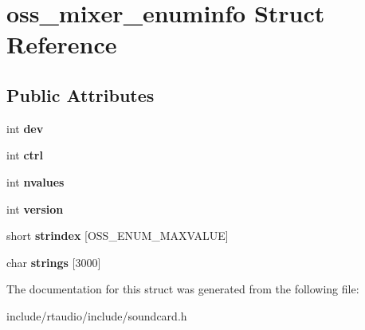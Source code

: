 \hypertarget{structoss__mixer__enuminfo}{}\section{oss\+\_\+mixer\+\_\+enuminfo Struct Reference}
\label{structoss__mixer__enuminfo}
\subsection*{Public Attributes}
\begin{DoxyCompactItemize}
\item 
int {\bfseries dev}\hypertarget{structoss__mixer__enuminfo_a0a095d65cd699916353ad98b5561ee25}{}\label{structoss__mixer__enuminfo_a0a095d65cd699916353ad98b5561ee25}

\item 
int {\bfseries ctrl}\hypertarget{structoss__mixer__enuminfo_a6bbb943986dc9652ee8e7e4406116524}{}\label{structoss__mixer__enuminfo_a6bbb943986dc9652ee8e7e4406116524}

\item 
int {\bfseries nvalues}\hypertarget{structoss__mixer__enuminfo_a6c956406b98fa814728f49ef7c1a2f63}{}\label{structoss__mixer__enuminfo_a6c956406b98fa814728f49ef7c1a2f63}

\item 
int {\bfseries version}\hypertarget{structoss__mixer__enuminfo_a33433a3ab275d3f1a0befba6ce5ca379}{}\label{structoss__mixer__enuminfo_a33433a3ab275d3f1a0befba6ce5ca379}

\item 
short {\bfseries strindex} \mbox{[}O\+S\+S\+\_\+\+E\+N\+U\+M\+\_\+\+M\+A\+X\+V\+A\+L\+UE\mbox{]}\hypertarget{structoss__mixer__enuminfo_a0d578746d488d7db3040aec4aa5027b1}{}\label{structoss__mixer__enuminfo_a0d578746d488d7db3040aec4aa5027b1}

\item 
char {\bfseries strings} \mbox{[}3000\mbox{]}\hypertarget{structoss__mixer__enuminfo_ace78e466acee837ab22296b8c31d883c}{}\label{structoss__mixer__enuminfo_ace78e466acee837ab22296b8c31d883c}

\end{DoxyCompactItemize}


The documentation for this struct was generated from the following file\+:\begin{DoxyCompactItemize}
\item 
include/rtaudio/include/soundcard.\+h\end{DoxyCompactItemize}
